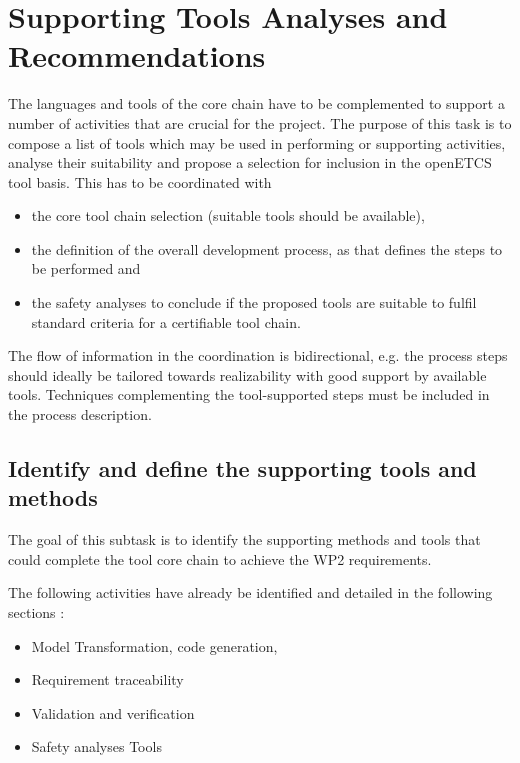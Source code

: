 \documentclass{template/openetcs_article}
\begin{document}
\section{Supporting Tools Analyses and Recommendations}
\label{sec:supporting_tools}

The languages and tools  of the core chain have to be complemented to support a number of activities that are crucial for the project. The purpose of this task is to compose a list of tools which may be
used in performing or supporting  activities, analyse their
suitability and propose a selection for inclusion in the openETCS tool
basis. This has to be coordinated with 

\begin{itemize}
\item the core tool chain selection (suitable  tools should be
  available), 
\item the definition of the overall development process, as that defines the steps to be performed and 
\item the safety analyses to  conclude if the proposed tools are suitable to fulfil standard criteria for a certifiable tool chain.
\end{itemize}

The flow of information in the coordination is bidirectional, e.g. the process
steps should ideally be tailored towards realizability with good
support by available tools. Techniques complementing the
tool-supported steps must be included in the process description. 
  


\subsection{Identify and define the supporting tools and methods}


The goal of this subtask  is to identify  the supporting methods and tools that could complete the tool core chain to  achieve the WP2 requirements.

The following activities  have already be identified and detailed in the following sections :

\begin{itemize}
\item Model Transformation, code generation,
\item Requirement traceability
\item Validation and verification
\item Safety analyses Tools
\end{itemize}
\end{document}
